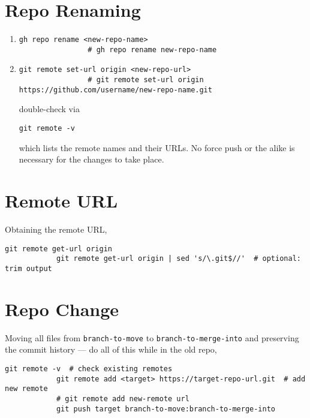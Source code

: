 \documentclass[12pt, a4paper]{scrbook}
\numberwithin{equation}{section}
\theoremstyle{definition}
\theoremstyle{definition}
\begin{document}
	\section{Repo Renaming}
		
		\begin{enumerate}
			\item 
			
			\begin{lstlisting}[style=mystylebash, label=alg:git__rename_repo_remote, xleftmargin=\parindent]
				gh repo rename <new-repo-name>
				# gh repo rename new-repo-name
			\end{lstlisting}
			
			\item
			
			\begin{lstlisting}[style=mystylebash, label=alg:git__rename_repo, xleftmargin=\parindent]
				git remote set-url origin <new-repo-url>
				# git remote set-url origin https://github.com/username/new-repo-name.git 
			\end{lstlisting}		
			double-check via
			\begin{lstlisting}[style=mystylebash, label=alg:git__check_remote_url, xleftmargin=\parindent]
				git remote -v
			\end{lstlisting}
			which lists the remote names and their URLs. No force push or the alike is necessary for the changes to take place.
		\end{enumerate}
	
	\section{Remote URL}
		Obtaining the remote URL, 
		
		\begin{lstlisting}[style=mystylebash, label=alg:git__remote_url, xleftmargin=\parindent]
			git remote get-url origin 
			git remote get-url origin | sed 's/\.git$//'  # optional: trim output
		\end{lstlisting}
		
	\section{Repo Change}
		Moving all files from \texttt{branch-to-move} to \texttt{branch-to-merge-into} and preserving the commit history --- do all of this while in the old repo,
		
		\begin{lstlisting}[style=mystylebash, xleftmargin=\parindent]
			git remote -v  # check existing remotes
			git remote add <target> https://target-repo-url.git  # add new remote
			# git remote add new-remote url
			git push target branch-to-move:branch-to-merge-into 
		\end{lstlisting}
	
\end{document}
